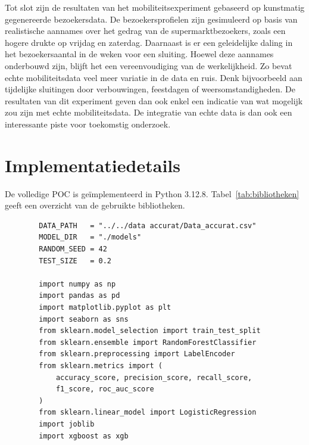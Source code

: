 Tot slot zijn de resultaten van het mobiliteitsexperiment gebaseerd op kunstmatig gegenereerde bezoekersdata. De bezoekersprofielen zijn gesimuleerd op basis van realistische aannames over het gedrag van de supermarktbezoekers, zoals een hogere drukte op vrijdag en zaterdag. Daarnaast is er een geleidelijke daling in het bezoekersaantal in de weken voor een sluiting. Hoewel deze aannames onderbouwd zijn, blijft het een vereenvoudiging van de werkelijkheid. Zo bevat echte mobiliteitsdata veel meer variatie in de data en ruis. Denk bijvoorbeeld aan tijdelijke sluitingen door verbouwingen, feestdagen of weersomstandigheden. De resultaten van dit experiment geven dan ook enkel een indicatie van wat mogelijk zou zijn met echte mobiliteitsdata. De integratie van echte data is dan ook een interessante piste voor toekomstig onderzoek.

\section{Implementatiedetails}
De volledige POC is geïmplementeerd in Python 3.12.8. Tabel~\ref{tab:bibliotheken} geeft een overzicht van de gebruikte bibliotheken.

\begin{listing}[H]
    \begin{verbatim}
        DATA_PATH   = "../../data accurat/Data_accurat.csv"
        MODEL_DIR   = "./models"
        RANDOM_SEED = 42
        TEST_SIZE   = 0.2
        
        import numpy as np
        import pandas as pd
        import matplotlib.pyplot as plt
        import seaborn as sns
        from sklearn.model_selection import train_test_split
        from sklearn.ensemble import RandomForestClassifier
        from sklearn.preprocessing import LabelEncoder
        from sklearn.metrics import (
            accuracy_score, precision_score, recall_score,
            f1_score, roc_auc_score
        )
        from sklearn.linear_model import LogisticRegression
        import joblib
        import xgboost as xgb
    \end{verbatim}
    \caption[Configuratie en bibliotheken]{Configuratie van de notebook en importeren van de gebruikte bibliotheken.}
\end{listing}

